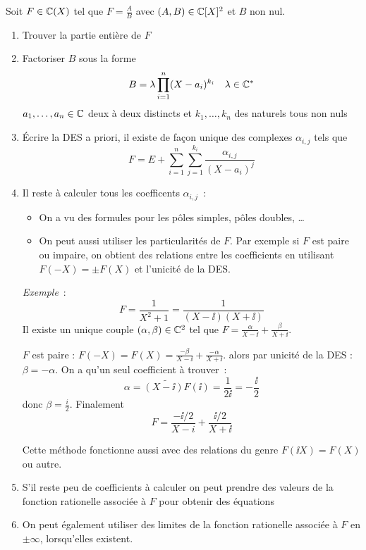 Soit $F \in \mathbb{C}(X)$ tel que $F=\frac{A}{B}$ avec $(A,B)\in\mathbb{C}[X]^2$ et $B$ non nul.
\begin{enumerate}
\item Trouver la partie entière de $F$
\item Factoriser $B$ sous la forme
  \begin{equation}
    B=\lambda \prod_{i=1}^n(X-a_i)^{k_i} \quad \lambda \in \mathbb{C}^*
  \end{equation}
  $a_1,\ldots,a_n \in \mathbb{C}$ deux à deux distincts et $k_1, \ldots, k_n$ des naturels tous non nuls
\item Écrire la DES a priori, il existe de façon unique des complexes $\alpha_{i,j}$ tels que
  \begin{equation}
    F=E+\sum_{i=1}^n\sum_{j=1}^{k_i} \frac{\alpha_{i,j}}{(X-a_i)^{j}}
  \end{equation}
\item Il reste à calculer tous les coefficents $\alpha_{i,j}$~:
  \begin{itemize}
  \item On a vu des formules pour les pôles simples, pôles doubles, \ldots
  \item On peut aussi utiliser les particularités de $F$. Par exemple si $F$ est paire ou impaire, on obtient des relations entre les coefficients en utilisant $F(-X)=\pm F(X)$ et l'unicité de la DES.
  \end{itemize}

\emph{Exemple}~:
\begin{equation}
  F=\frac{1}{X^2+1}=\frac{1}{(X-\ii)(X+\ii)}
\end{equation}
Il existe un unique couple $(\alpha,\beta) \in \mathbb{C}^2$ tel que $F=\frac{\alpha}{X-\ii}+\frac{\beta}{X+\ii}$.

$F$ est paire : $F(-X)=F(X)=\frac{-\beta}{X-\ii}+ \frac{-\alpha}{X+\ii}$. alors par unicité de la DES : $\beta=-\alpha$. On a qu'un seul coefficient à trouver~:
\begin{equation}
  \alpha = \widetilde{(X-\ii)F}(\ii) = \frac{1}{2\ii} = -\frac{\ii}{2}
\end{equation}
donc $\beta=\frac{i}{2}$. Finalement
\begin{equation}
  F = \frac{-\ii/2}{X-i}+\frac{\ii/2}{X+\ii}
\end{equation}

Cette méthode fonctionne aussi avec des relations du genre $F(\ii X)=F(X)$ ou autre.
\item S'il reste peu de coefficients à calculer on peut prendre des valeurs de la fonction rationelle associée à $F$ pour obtenir des équations
\item On peut également utiliser des limites de la fonction rationelle associée à $F$ en $\pm \infty$, lorsqu'elles existent.
\end{enumerate}

